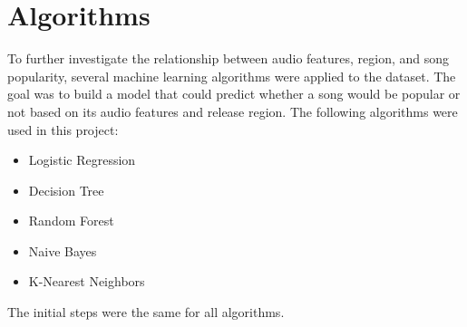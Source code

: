 \chapter{Algorithms}

To further investigate the relationship between audio features, region, and song popularity, several machine learning algorithms were applied to the dataset. The goal was to build a model that could predict whether a song would be popular or not based on its audio features and release region. The following algorithms were used in this project:

\begin{itemize}
    \item Logistic Regression
    \item Decision Tree
    \item Random Forest
    \item Naive Bayes
    \item K-Nearest Neighbors
\end{itemize}

The initial steps were the same for all algorithms.

